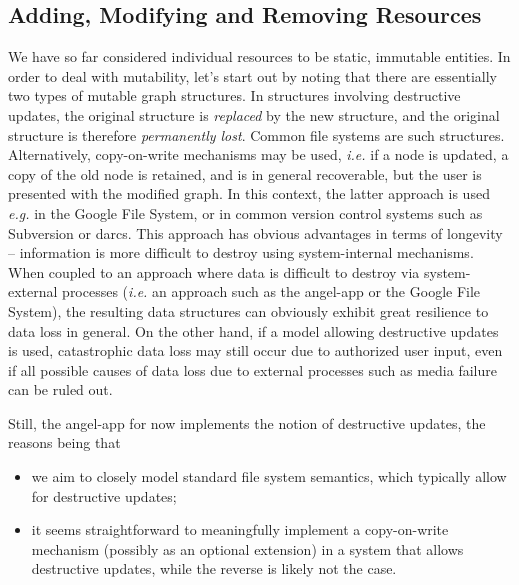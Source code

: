 \documentclass[11pt]{article}
\begin{document}
\begin{mainmatter}
\subsection{Adding, Modifying and Removing Resources}

We have so far considered individual resources to be static, immutable entities. In order to deal with mutability, let's start out by noting that there are essentially two types of mutable graph structures. In structures involving destructive updates, the original structure is \emph{replaced} by the new structure, and the original structure is therefore \emph{permanently lost}. Common file systems are such structures. Alternatively, copy-on-write mechanisms may be used, \emph{i.e.} if a node is updated, a copy of the old node is retained, and is in general recoverable, but the user is presented with the modified graph. In this context, the latter approach is used \emph{e.g.} in the Google File System\cite{gfs}, or in common version control systems such as Subversion\cite{svn} or darcs\cite{darcs}. This approach has obvious advantages in terms of longevity -- information is more difficult to destroy using system-internal mechanisms. When coupled to an approach where data is difficult to destroy via system-external processes (\emph{i.e.} an approach such as the angel-app or the Google File System), the resulting data structures can obviously exhibit great resilience to data loss in general. On the other hand, if a model allowing destructive updates is used, catastrophic data loss may still occur due to authorized user input, even if all possible causes of data loss due to external processes such as media failure can be ruled out.

Still, the angel-app for now implements the notion of destructive updates, the reasons being that
\begin{itemize}
\item we aim to closely model standard file system semantics, which typically allow for destructive updates;
\item it seems straightforward to meaningfully implement a copy-on-write mechanism (possibly as an optional extension) in a system that allows destructive updates, while the reverse is likely not the case.
\end{itemize}


\end{mainmatter}
\end{document}
